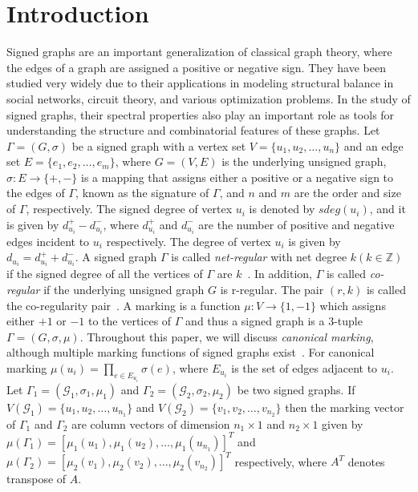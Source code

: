 \documentclass[12pt,a4paper]{article}
\theoremstyle{definition}
\theoremstyle{remark}
\begin{document}
\section{Introduction}
    Signed graphs are an important generalization of classical graph theory, where the edges of a graph are assigned a positive or negative sign. They have been studied very widely due to their applications in modeling structural balance in social networks, circuit theory, and various optimization problems. In the study of signed graphs, their spectral properties also play an important role as tools for understanding the structure and combinatorial features of these graphs. Let $\Gamma=(G,\sigma)$ be a signed graph with a vertex set $V=\{u_1,u_2,\ldots,u_n\}$ and an edge set $E=\{e_1,e_2,\ldots,e_m\}$, where $G=(V, E)$ is the underlying unsigned graph, $\sigma: E\rightarrow \{+,-\}$ is a mapping that assigns either a positive or a negative sign to the edges of $\Gamma$, known as the signature of $\Gamma$, and $n$ and $m$ are the order and size of $\Gamma$, respectively. The signed degree of vertex $u_i$ is denoted by $sdeg(u_i)$, and it is given by $d_{u_i}^+-d_{u_i}^-$, where $d_{u_i}^+$ and $d_{u_i}^-$ are the number of positive and negative edges incident to $u_i$ respectively. The degree of vertex $u_i$ is given by $d_{u_i}=d_{u_i}^++d_{u_i}^-$. A signed graph $\Gamma$ is called \textit{net-regular} with net degree $k(k\in\mathbb{Z})$ if the signed degree of all the vertices of $\Gamma$ are $k$~\cite{nayak2016net}. In addition, $\Gamma$ is called \textit{co-regular} if the underlying unsigned graph $G$ is r-regular. The pair $(r,k)$ is called the co-regularity pair~\cite{shahul2015co}.
    A marking is a function $\mu:V\rightarrow\{1,-1\}$ which assigns either $+1$ or $-1$ to the vertices of $\Gamma$ and thus a signed graph is a $3$-tuple $\Gamma=(G,\sigma,\mu)$. Throughout this paper, we will discuss \textit{canonical marking}, although multiple marking functions of signed graphs exist~\cite {adhikari2023corona}. For canonical marking $\mu(u_i)=\prod_{e\in E_{u_i}}\sigma(e)$, where $E_{u_i}$ is the set of edges adjacent to $u_i$.
    Let $\Gamma_1=(\mathcal{G}_1,\sigma_1,\mu_1)$ and $\Gamma_2=(\mathcal{G}_2,\sigma_2,\mu_2)$ be two signed graphs. If $V(\mathcal{G}_1)=\{u_1,u_2,\ldots,u_{n_1}\}$ and $V(\mathcal{G}_2)=\{v_1,v_2,\ldots,v_{n_2}\}$ then the marking vector of $\Gamma_1$ and $\Gamma_2$ are column vectors of dimension $n_1\times1$ and $n_2\times1$ given by $\mu(\Gamma_1)=[\mu_1(u_1),\mu_1(u_2),\ldots,\mu_1(u_{n_1})]^T$ and $\mu(\Gamma_2)=[\mu_2(v_1),\mu_2(v_2),\ldots,\mu_2(v_{n_2})]^T$ respectively, where $A^T$ denotes transpose of $A$.
\end{document}
